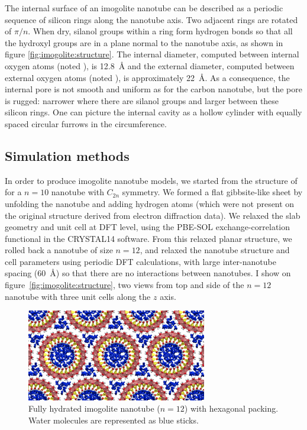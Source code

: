 \documentclass[thesis]{subfiles}
\begin{document}
The internal surface of an imogolite nanotube can be described as a periodic
sequence of silicon rings along the nanotube axis. Two adjacent rings are
rotated of $\pi / n$. When dry, silanol groups within a ring form hydrogen bonds
so that all the hydroxyl groups are in a plane normal to the nanotube axis, as
shown in figure \ref{fig:imogolite:structure}. The internal diameter, computed
between internal oxygen atoms (noted ), is \SI{12.8}{\AA} and the
external diameter, computed between external oxygen atoms (noted ),
is approximately \SI{22}{\AA}. As a consequence, the internal pore is not smooth
and uniform as for the carbon nanotube, but the pore is rugged: narrower where
there are silanol groups and larger between these silicon rings. One can picture
the internal cavity as a hollow cylinder with equally spaced circular furrows in
the circumference.

\subsection{Simulation methods}

In order to produce imogolite nanotube models, we started from the structure of
\citeauthor{Cradwick1972}\cite{Cradwick1972} for a $n=10$ nanotube with $C_{2n}$
symmetry. We formed a flat gibbsite-like sheet by unfolding the nanotube and
adding hydrogen atoms (which were not present on the original structure derived
from electron diffraction data). We relaxed the slab geometry and unit cell at
DFT level, using the PBE-SOL exchange-correlation functional\cite{Perdew2008} in
the CRYSTAL14 software\cite{Dovesi2014}. From this relaxed planar structure, we
rolled back a nanotube of size $n=12$, and relaxed the nanotube structure and
cell parameters using periodic DFT calculations, with large inter-nanotube
spacing (\SI{60}{\AA}) so that there are no interactions between nanotubes. I
show on figure~\ref{fig:imogolite:structure}, two views from top and side of the
$n=12$ nanotube with three unit cells along the $z$ axis.

\begin{figure}[t]
	\centering
	\includegraphics[width=0.7\textwidth]{figures/images/imogolite-gcmc-result}
	\caption{Fully hydrated imogolite nanotube ($n=12$) with hexagonal packing.
    Water molecules are represented as blue sticks.}
    \label{fig:imogolite:gcmc-result}
\end{figure}
\end{document}
